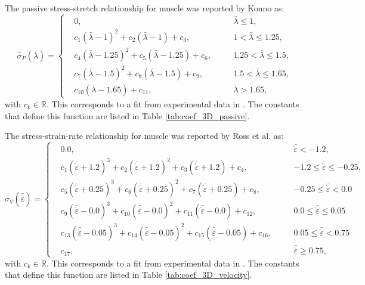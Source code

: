 \documentclass{sfuthesis}
\numberwithin{equation}{section}
\numberwithin{figure}{chapter}
\numberwithin{table}{chapter}
\theoremstyle{definition}
\newcommand{\depsilon}{\dot{\varepsilon}}
\newcommand{\R}{\mathbb{R}}
\begin{document}
\begin{appendices}
The passive stress-stretch relationship for muscle was reported by Konno \cite{KonnoNigamWakeling2021_ECM} as:
\begin{equation} 
\widehat{\sigma}_P(\bar{\lambda}) = \left\{
\begin{aligned}
&0, \quad &&\bar{\lambda} \leq 1, \\
&c_1 (\bar{\lambda}-1)^2 + c_2 (\bar{\lambda}-1) + c_3, \quad &&1 < \bar{\lambda} \leq 1.25, \\
&c_4 (\bar{\lambda}-1.25)^2 + c_5 (\bar{\lambda} - 1.25) + c_6, \quad && 1.25 < \bar{\lambda} \leq 1.5, \\
&c_7 (\bar{\lambda}-1.5)^2 + c_8 (\bar{\lambda}-1.5) + c_9, \quad &&1.5 < \bar{\lambda} \leq 1.65, \\
&c_{10} (\bar{\lambda}-1.65) + c_{11}, \quad && \bar{\lambda} > 1.65,
\end{aligned}
\right.
\end{equation}
with $c_k \in \R$. This corresponds to a fit from experimental data in \cite{Winters2011}. The constants that define this function are listed in Table \ref{tab:coef_3D_passive}.

The stress-strain-rate relationship for muscle was reported by Ross et al. \cite{Ross2018-1D} as:
\begin{equation} 
\widehat{\sigma}_V(\bar{\depsilon}) = \left\{
\begin{aligned}
&0.0, \quad && \bar{\depsilon} < -1.2, \\
&c_1 \left( \bar{\depsilon} + 1.2 \right)^3 + c_2 \left( \bar{\depsilon} + 1.2 \right)^2 + c_3 \left( \bar{\depsilon} + 1.2 \right) + c_4, \quad &&-1.2 \leq \bar{\depsilon} \leq -0.25, \\
&c_5 \left( \bar{\depsilon} + 0.25 \right)^3 + c_6 \left( \bar{\depsilon} + 0.25 \right)^2 + c_7 \left( \bar{\depsilon} + 0.25 \right) + c_8, \quad &&-0.25 \leq \bar{\depsilon} < 0.0 \\
&c_9 \left( \bar{\depsilon} - 0.0 \right)^3 + c_{10} \left( \bar{\depsilon} - 0.0 \right)^2 + c_{11} \left( \bar{\depsilon} - 0.0 \right) + c_{12}, \quad &&0.0 \leq \bar{\depsilon} \leq 0.05 \\
&c_{13} \left( \bar{\depsilon} - 0.05 \right)^3 + c_{14} \left( \bar{\depsilon} - 0.05 \right)^2 + c_{15} \left( \bar{\depsilon} - 0.05 \right) + c_{16}, \quad &&0.05 \leq \bar{\depsilon} < 0.75 \\
&c_{17}, \quad && \bar{\depsilon} \geq 0.75,
\end{aligned}
\right.
\end{equation}
with $c_k \in \R$. This corresponds to a fit from experimental data in \cite{Roots2007}. The constants that define this function are listed in Table \ref{tab:coef_3D_velocity}.


\end{appendices}
\end{document}
